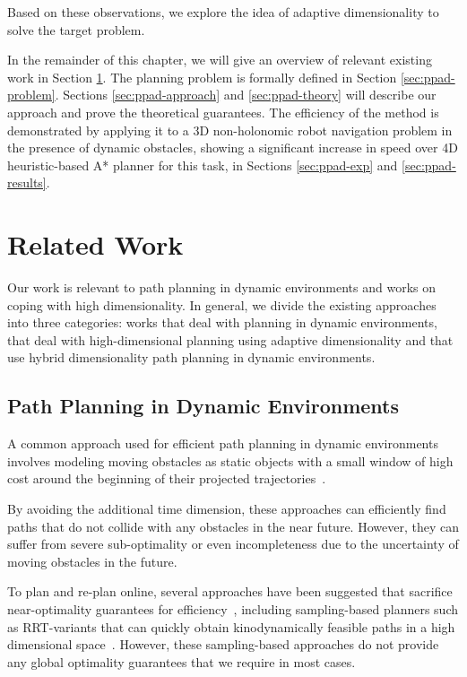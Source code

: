 Based on these observations, we explore the idea of adaptive dimensionality to solve the target problem.

In the remainder of this chapter, we will give an overview of relevant existing work in Section \ref{sec:ppad-related-work}. 
The planning problem is formally defined in Section \ref{sec:ppad-problem}.
Sections \ref{sec:ppad-approach} and \ref{sec:ppad-theory} will describe our approach and prove the theoretical guarantees. The efficiency of the method is demonstrated by applying it to a 3D non-holonomic robot navigation problem in the presence of dynamic obstacles, showing a significant increase in speed over 4D heuristic-based A* planner for this task, in Sections \ref{sec:ppad-exp} and \ref{sec:ppad-results}.

\section{Related Work}
\label{sec:ppad-related-work}
Our work is relevant to path planning in dynamic environments and works on coping with high dimensionality. In general, we divide the existing approaches into three categories: works that deal with planning in dynamic environments, that deal with high-dimensional planning using adaptive dimensionality and that use hybrid dimensionality path planning in dynamic environments.

\subsection{Path Planning in Dynamic Environments}

A common approach used for efficient path planning in dynamic environments involves modeling moving obstacles as static objects with a small window of high cost around the beginning of their projected trajectories~\cite{likhachev2009planning,rufli2009smooth}. 

By avoiding the additional time dimension,
these approaches can efficiently find paths that do not collide with any obstacles in the near future. However, they can suffer from severe sub-optimality or even incompleteness due to the uncertainty of moving obstacles in the future.

To plan and re-plan online, several approaches have been suggested that sacrifice near-optimality guarantees for efficiency~\cite{van2006anytime}, including sampling-based planners such as RRT-variants that can quickly obtain kinodynamically feasible paths in a high dimensional space~\cite{bekris2007greedy,petti2005safe}. However, these sampling-based approaches do not provide any global optimality guarantees that we require in most cases. 

